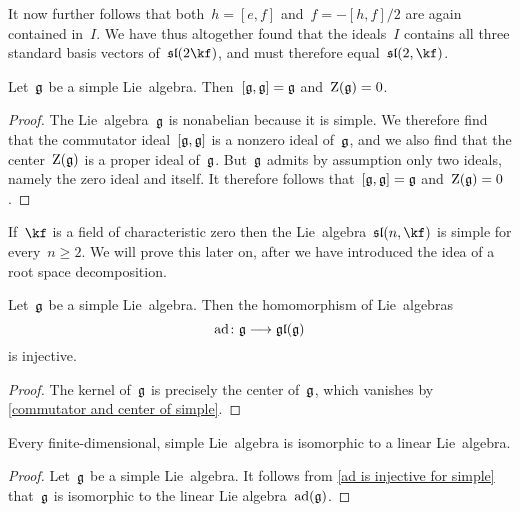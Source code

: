 \begin{examples}
\begin{enumerate}
      It now further follows that both~$h = [e,f]$ and~$f = -[h,f]/2$ are again contained in~$I$.
      We have thus altogether found that the ideals~$I$ contains all three standard basis vectors of~$\sllie(2 \kf)$, and must therefore equal~$\sllie(2, \kf)$.
  \end{enumerate}
\end{examples}


\begin{proposition}
  \label{commutator and center of simple}
  Let~$\mathfrak{g}$ be a simple Lie~algebra.
  Then~$[\mathfrak{g}, \mathfrak{g}] = \mathfrak{g}$ and~$\operatorname{Z}(\mathfrak{g}) = 0$.
\end{proposition}


\begin{proof}
  The Lie~algebra~$\mathfrak{g}$ is nonabelian because it is simple.
  We therefore find that the commutator ideal~$[\mathfrak{g}, \mathfrak{g}]$ is a nonzero ideal of~$\mathfrak{g}$, and we also find that the center~$\operatorname{Z}(\mathfrak{g})$ is a proper ideal of~$\mathfrak{g}$.
  But~$\mathfrak{g}$ admits by assumption only two ideals, namely the zero ideal and itself.
  It therefore follows that~$[\mathfrak{g}, \mathfrak{g}] = \mathfrak{g}$ and~$\operatorname{Z}(\mathfrak{g}) = 0$.
\end{proof}


\begin{remark}
  If~$\kf$ is a field of characteristic zero then the Lie~algebra~$\sllie(n, \kf)$ is simple for every~$n \geq 2$.
  We will prove this later on, after we have introduced the idea of a root space decomposition.
\end{remark}


\begin{corollary}
  \label{ad is injective for simple}
  Let~$\mathfrak{g}$ be a simple Lie~algebra.
  Then the homomorphism of Lie~algebras
  \[
    \ad
    \colon
    \glie
    \to
    \gllie(\glie)
  \]
  is injective.
\end{corollary}

\begin{proof}
  The kernel of~$\mathfrak{g}$ is precisely the center of~$\mathfrak{g}$, which vanishes by \cref{commutator and center of simple}.
\end{proof}

\begin{corollary}
  Every finite-dimensional, simple Lie~algebra is isomorphic to a linear Lie~algebra.
\end{corollary}

\begin{proof}
  Let~$\mathfrak{g}$ be a simple Lie~algebra.
  It follows from \cref{ad is injective for simple} that~$\mathfrak{g}$ is isomorphic to the linear Lie algebra~$\operatorname{ad}(\mathfrak{g})$.
\end{proof}


